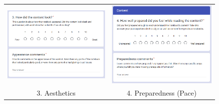 \begin{appendices}
\begin{figure}[H]
\begin{tabular}{cc}
\includegraphics[width=65mm]{images/questionnaire/q3} &   \includegraphics[width=65mm]{images/questionnaire/q4} \\
3. Aesthetics & 4. Preparedness (Pace) \\[6pt]
\end{tabular}
\end{figure}


\end{appendices}
